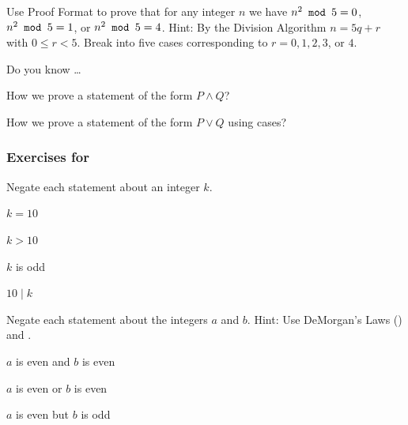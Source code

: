 \begin{exer}[\exerU] %
\label{exer_sq_mod5}
    Use Proof Format  to prove that for any integer $n$ we have $n^2 \texttt{ mod } 5 = 0$, $n^2 \texttt{ mod } 5 = 1$, or $n^2 \texttt{ mod } 5 = 4$.  Hint: By the Division Algorithm $n = 5q+r$ with $0 \le r < 5$.  Break into five cases corresponding to $r=0, 1, 2, 3$, or $4$.
\end{exer}

\begin{exer}[\exerR] %
\label{exer_dyk_pff_and_or_by_cases}
    Do you know \ldots
        \begin{exerpart}
            \item How we prove a statement of the form $P \land Q$?
            \item How we prove a statement of the form $P \lor Q$ using cases? 
        \end{exerpart}
\end{exer}


\subsubsection*{Exercises for  
\subequivneg}

\begin{exer}[\exerP] %
\label{exer_my_first_negate}
    Negate each statement about an integer $k$.
        \begin{exerpart}
            \item $k=10$
            \item $k>10$
            \item $k$ is odd
            \item $10 \mid k$          
        \end{exerpart}
\end{exer}

\begin{exer}[\exerP] %
\label{exer_my_first_demorgans}
    Negate each statement about the integers $a$ and $b$.  Hint: Use DeMorgan's Laws () and .
        \begin{exerpart}
            \item $a$ is even and $b$ is even
            \item $a$ is even or $b$ is even  
            \item $a$ is even but $b$ is odd
        \end{exerpart}
\end{exer}

